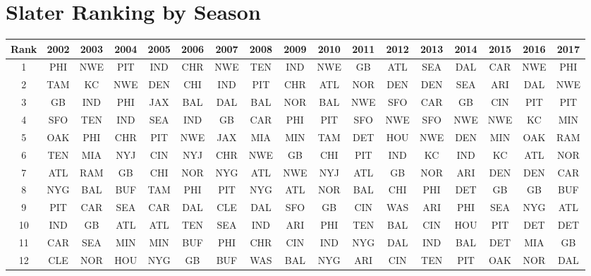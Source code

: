 \documentclass[11pt]{article}
\begin{document}
\newcommand{\appsection}[1]{\let\oldthesection\thesection
  \renewcommand{\thesection}{Appendix \oldthesection}
  \section{#1}\let\thesection\oldthesection}
  
\appsection{Slater Ranking by Season}\label{app:slater_ranking}

\begin{table}[!htb]
\begin{center}
\scriptsize
\begin{tabular}{|c|c|c|c|c|c|c|c|c|c|c|c|c|c|c|c|c|}
\hline
Rank & 2002 & 2003 & 2004 & 2005 & 2006 & 2007 & 2008 & 2009 & 2010 & 2011 & 2012 & 2013 & 2014 & 2015 & 2016 & 2017\\
 \hline
1 & PHI & NWE & PIT & IND & CHR & NWE & TEN & IND & NWE & GB & ATL & SEA & DAL & CAR & NWE & PHI\\
2 & TAM & KC & NWE & DEN & CHI & IND & PIT & CHR & ATL & NOR & DEN & DEN & SEA & ARI & DAL & NWE\\
3 & GB & IND & PHI & JAX & BAL & DAL & BAL & NOR & BAL & NWE & SFO & CAR & GB & CIN & PIT & PIT\\
4 & SFO & TEN & IND & SEA & IND & GB & CAR & PHI & PIT & SFO & NWE & SFO & NWE & NWE & KC & MIN\\
5 & OAK & PHI & CHR & PIT & NWE & JAX & MIA & MIN & TAM & DET & HOU & NWE & DEN & MIN & OAK & RAM\\
6 & TEN & MIA & NYJ & CIN & NYJ & CHR & NWE & GB & CHI & PIT & IND & KC & IND & KC & ATL & NOR\\
7 & ATL & RAM & GB & CHI & NOR & NYG & ATL & NWE & NYJ & ATL & GB & NOR & ARI & DEN & DEN & CAR\\
8 & NYG & BAL & BUF & TAM & PHI & PIT & NYG & ATL & NOR & BAL & CHI & PHI & DET & GB & GB & BUF\\
9 & PIT & CAR & SEA & CAR & DAL & CLE & DAL & SFO & GB & CIN & WAS & ARI & PHI & SEA & NYG & ATL\\
10 & IND & GB & ATL & ATL & TEN & SEA & IND & ARI & PHI & TEN & BAL & CIN & HOU & PIT & DET & DET\\
11 & CAR & SEA & MIN & MIN & BUF & PHI & CHR & CIN & IND & NYG & DAL & IND & BAL & DET & MIA & GB\\
12 & CLE & NOR & HOU & NYG & GB & BUF & WAS & BAL & NYG & ARI & CIN & TEN & PIT & OAK & NOR & DAL\\

\end{tabular}
\end{center}
\end{table}
\end{document}
